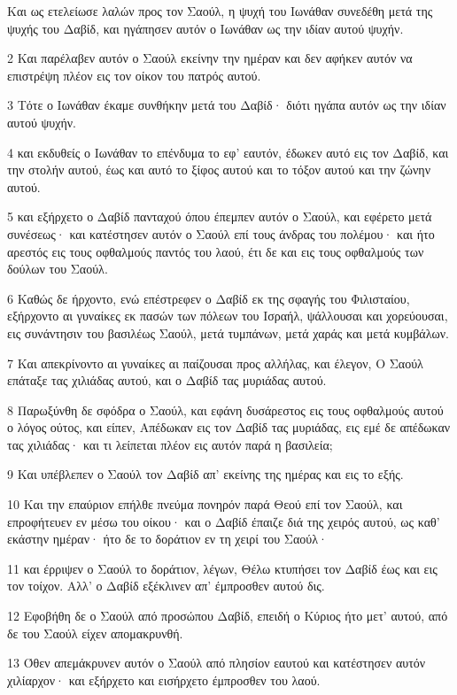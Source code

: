 \par Και ως ετελείωσε λαλών προς τον Σαούλ, η ψυχή του Ιωνάθαν συνεδέθη μετά της ψυχής του Δαβίδ, και ηγάπησεν αυτόν ο Ιωνάθαν ως την ιδίαν αυτού ψυχήν.
\par 2 Και παρέλαβεν αυτόν ο Σαούλ εκείνην την ημέραν και δεν αφήκεν αυτόν να επιστρέψη πλέον εις τον οίκον του πατρός αυτού.
\par 3 Τότε ο Ιωνάθαν έκαμε συνθήκην μετά του Δαβίδ· διότι ηγάπα αυτόν ως την ιδίαν αυτού ψυχήν.
\par 4 και εκδυθείς ο Ιωνάθαν το επένδυμα το εφ' εαυτόν, έδωκεν αυτό εις τον Δαβίδ, και την στολήν αυτού, έως και αυτό το ξίφος αυτού και το τόξον αυτού και την ζώνην αυτού.
\par 5 και εξήρχετο ο Δαβίδ πανταχού όπου έπεμπεν αυτόν ο Σαούλ, και εφέρετο μετά συνέσεως· και κατέστησεν αυτόν ο Σαούλ επί τους άνδρας του πολέμου· και ήτο αρεστός εις τους οφθαλμούς παντός του λαού, έτι δε και εις τους οφθαλμούς των δούλων του Σαούλ.
\par 6 Καθώς δε ήρχοντο, ενώ επέστρεφεν ο Δαβίδ εκ της σφαγής του Φιλισταίου, εξήρχοντο αι γυναίκες εκ πασών των πόλεων του Ισραήλ, ψάλλουσαι και χορεύουσαι, εις συνάντησιν του βασιλέως Σαούλ, μετά τυμπάνων, μετά χαράς και μετά κυμβάλων.
\par 7 Και απεκρίνοντο αι γυναίκες αι παίζουσαι προς αλλήλας, και έλεγον, Ο Σαούλ επάταξε τας χιλιάδας αυτού, και ο Δαβίδ τας μυριάδας αυτού.
\par 8 Παρωξύνθη δε σφόδρα ο Σαούλ, και εφάνη δυσάρεστος εις τους οφθαλμούς αυτού ο λόγος ούτος, και είπεν, Απέδωκαν εις τον Δαβίδ τας μυριάδας, εις εμέ δε απέδωκαν τας χιλιάδας· και τι λείπεται πλέον εις αυτόν παρά η βασιλεία;
\par 9 Και υπέβλεπεν ο Σαούλ τον Δαβίδ απ' εκείνης της ημέρας και εις το εξής.
\par 10 Και την επαύριον επήλθε πνεύμα πονηρόν παρά Θεού επί τον Σαούλ, και επροφήτευεν εν μέσω του οίκου· και ο Δαβίδ έπαιζε διά της χειρός αυτού, ως καθ' εκάστην ημέραν· ήτο δε το δοράτιον εν τη χειρί του Σαούλ·
\par 11 και έρριψεν ο Σαούλ το δοράτιον, λέγων, Θέλω κτυπήσει τον Δαβίδ έως και εις τον τοίχον. Αλλ' ο Δαβίδ εξέκλινεν απ' έμπροσθεν αυτού δις.
\par 12 Εφοβήθη δε ο Σαούλ από προσώπου Δαβίδ, επειδή ο Κύριος ήτο μετ' αυτού, από δε του Σαούλ είχεν απομακρυνθή.
\par 13 Όθεν απεμάκρυνεν αυτόν ο Σαούλ από πλησίον εαυτού και κατέστησεν αυτόν χιλίαρχον· και εξήρχετο και εισήρχετο έμπροσθεν του λαού.
